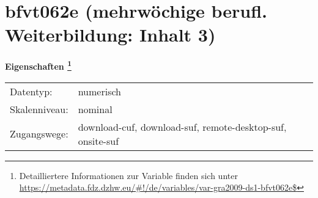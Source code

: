 
    \setcounter{footnote}{0}

    \vspace*{-1.8cm}
	\section{bfvt062e (mehrwöchige berufl. Weiterbildung: Inhalt 3)}
	\label{section:bfvt062e}



    \vspace*{0.5cm}
    \noindent\textbf{Eigenschaften
	\footnote{Detailliertere Informationen zur Variable finden sich unter
		\url{https://metadata.fdz.dzhw.eu/\#!/de/variables/var-gra2009-ds1-bfvt062e$}}}\\
	\begin{tabularx}{\hsize}{@{}lX}
	Datentyp: & numerisch \\
	Skalenniveau: & nominal \\
	Zugangswege: &
	  download-cuf, 
	  download-suf, 
	  remote-desktop-suf, 
	  onsite-suf
 \\
    \end{tabularx}




